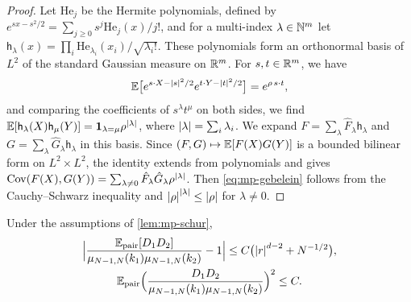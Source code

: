 \begin{proof}
Let $\mathrm{He}_j$ be the Hermite polynomials, defined by $e^{sx-s^2/2}=\sum_{j\ge0}s^j\mathrm{He}_j(x)/j!$, and for a multi-index $\lambda\in\mathbb N^m$ let $\mathsf h_\lambda(x)=\prod_i\mathrm{He}_{\lambda_i}(x_i)/\sqrt{\lambda_i!}$. These polynomials form an orthonormal basis of $L^2$ of the standard Gaussian measure on $\mathbb R^m$. For $s,t\in\mathbb R^m$, we have
\[
\mathbb E\bigl[e^{s\cdot X-\left|s\right|^2/2}e^{t\cdot Y-\left|t\right|^2/2}\bigr]=e^{\rho\,s\cdot t},
\]
and comparing the coefficients of $s^\lambda t^\mu$ on both sides, we find $\mathbb E[\mathsf h_\lambda(X)\mathsf h_\mu(Y)]=\mathbf 1_{\lambda=\mu}\rho^{\left|\lambda\right|}$, where $\left|\lambda\right|=\sum_i\lambda_i$. We expand $F=\sum_\lambda\hat F_\lambda\mathsf h_\lambda$ and $G=\sum_\lambda\hat G_\lambda\mathsf h_\lambda$ in this basis. Since $(F,G)\mapsto\mathbb E[F(X)G(Y)]$ is a bounded bilinear form on $L^2\times L^2$, the identity extends from polynomials and gives $\operatorname{Cov}(F(X),G(Y))=\sum_{\lambda\ne0}\hat F_\lambda\hat G_\lambda\rho^{\left|\lambda\right|}$. Then \eqref{eq:mp-gebelein} follows from the Cauchy--Schwarz inequality and $\left|\rho\right|^{\left|\lambda\right|}\le\left|\rho\right|$ for $\lambda\ne0$.
\end{proof}

\begin{lemma}\label{lem:mp-bulk}
Under the assumptions of \cref{lem:mp-schur},
\begin{equation}\label{eq:mp-det-ratio}
\begin{gathered}
\Bigl|\frac{\mathbb E_{\mathrm{pair}}[D_1D_2]}{\mu_{N-1,N}(k_1)\mu_{N-1,N}(k_2)}-1\Bigr|\le C\bigl(\left|r\right|^{d-2}+N^{-1/2}\bigr),\\
\mathbb E_{\mathrm{pair}}\Bigl(\frac{D_1D_2}{\mu_{N-1,N}(k_1)\mu_{N-1,N}(k_2)}\Bigr)^2\le C.
\end{gathered}
\end{equation}
\end{lemma}

